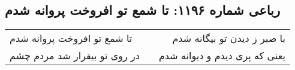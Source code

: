 \begin{center}
\section*{رباعی شماره ۱۱۹۶: تا شمع تو افروخت پروانه شدم}
\label{sec:1196}
\begin{longtable}{l p{0.5cm} r}
تا شمع تو افروخت پروانه شدم
&&
با صبر ز دیدن تو بیگانه شدم
\\
در روی تو بیقرار شد مردم چشم
&&
یعنی که پری دیدم و دیوانه شدم
\\
\end{longtable}
\end{center}
